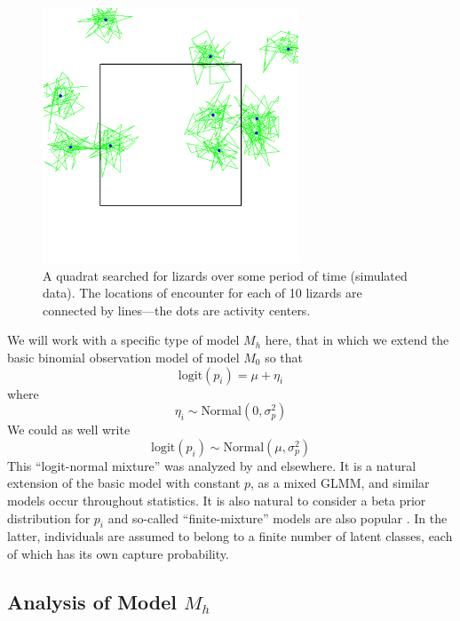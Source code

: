 \begin{figure}
\begin{center}
\includegraphics[height=3in]{Ch3-Closed/figs/quadrat}
\end{center}
\caption{A quadrat searched for lizards over some period of time
  (simulated data). The locations of encounter for each of 10 lizards are
  connected by lines---the dots are activity centers.}
\label{closed.fig.quadrat}
\end{figure}

We will work with a specific type of model $M_{h}$ here, that in which
we extend the basic binomial observation model of model $M_{0}$ so
that
\[
\mbox{logit}(p_{i}) = \mu + \eta_{i}
\]
where
\[
\eta_{i} \sim \mbox{Normal}(0, \sigma_{p}^2)
\]
We could as well write
\[
\mbox{logit}(p_{i}) \sim \mbox{Normal}(\mu,\sigma_{p}^2)
\]
This ``logit-normal mixture'' was analyzed by
\citet{coull_agresti:1999} and elsewhere. It is a natural extension of
the basic model with constant $p$, as a mixed GLMM, and similar models
occur throughout statistics. It is also natural to consider a beta
prior distribution for $p_{i}$ \citep{dorazio_royle:2003} and
so-called ``finite-mixture'' models are also popular
\citep{norris_pollock:1996, pledger:2000}. In the latter, individuals
are assumed to belong to a finite number of latent classes, each of
which has its own capture probability.


\subsection{Analysis of Model $M_h$}

